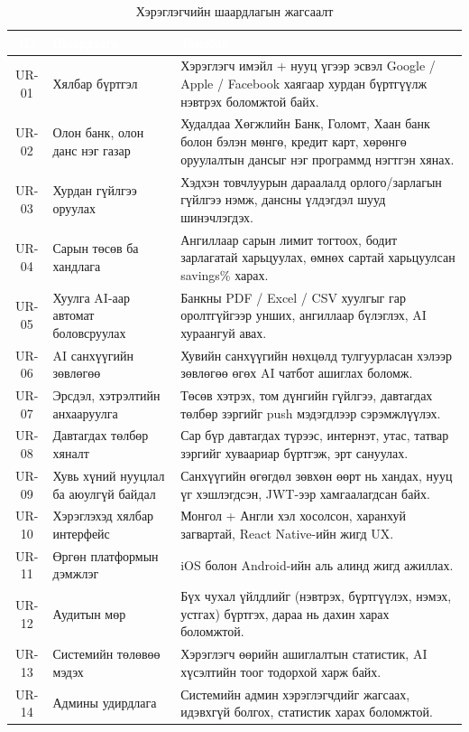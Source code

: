 \begin{table}[ht]
\centering
\footnotesize
\renewcommand{\arraystretch}{1.3}
\begin{tabular}{|c|p{3.7cm}|p{8cm}|}
\hline
\rowcolor{darknavy}
\textcolor{white}{\textbf{ID}} & \textcolor{white}{\textbf{Шаардлага}} & \textcolor{white}{\textbf{Тайлбар}} \\ \hline
UR-01 & Хялбар бүртгэл              & Хэрэглэгч имэйл + нууц үгээр эсвэл Google / Apple / Facebook хаягаар хурдан бүртгүүлж нэвтрэх боломжтой байх. \\ \hline
UR-02 & Олон банк, олон данс нэг газар & Худалдаа Хөгжлийн Банк, Голомт, Хаан банк болон бэлэн мөнгө, кредит карт, хөрөнгө оруулалтын дансыг нэг программд нэгтгэн хянах. \\ \hline
UR-03 & Хурдан гүйлгээ оруулах      & Хэдхэн товчлуурын дараалалд орлого/зарлагын гүйлгээ нэмж, дансны үлдэгдэл шууд шинэчлэгдэх. \\ \hline
UR-04 & Сарын төсөв ба хандлага     & Ангиллаар сарын лимит тогтоох, бодит зарлагатай харьцуулах, өмнөх сартай харьцуулсан savings\% харах. \\ \hline
UR-05 & Хуулга AI-аар автомат боловсруулах & Банкны PDF / Excel / CSV хуулгыг гар оролтгүйгээр унших, ангиллаар бүлэглэх, AI хураангуй авах. \\ \hline
UR-06 & AI санхүүгийн зөвлөгөө      & Хувийн санхүүгийн нөхцөлд тулгуурласан хэлээр зөвлөгөө өгөх AI чатбот ашиглах боломж. \\ \hline
UR-07 & Эрсдэл, хэтрэлтийн анхааруулга & Төсөв хэтрэх, том дүнгийн гүйлгээ, давтагдах төлбөр зэргийг push мэдэгдлээр сэрэмжлүүлэх. \\ \hline
UR-08 & Давтагдах төлбөр хяналт     & Сар бүр давтагдах түрээс, интернэт, утас, татвар зэргийг хуваариар бүртгэж, эрт сануулах. \\ \hline
UR-09 & Хувь хүний нууцлал ба аюулгүй байдал & Санхүүгийн өгөгдөл зөвхөн өөрт нь хандах, нууц үг хэшлэгдсэн, JWT-ээр хамгаалагдсан байх. \\ \hline
UR-10 & Хэрэглэхэд хялбар интерфейс & Монгол + Англи хэл хосолсон, харанхуй загвартай, React Native-ийн жигд UX. \\ \hline
UR-11 & Өргөн платформын дэмжлэг    & iOS болон Android-ийн аль алинд жигд ажиллах. \\ \hline
UR-12 & Аудитын мөр                  & Бүх чухал үйлдлийг (нэвтрэх, бүртгүүлэх, нэмэх, устгах) бүртгэх, дараа нь дахин харах боломжтой. \\ \hline
UR-13 & Системийн төлөвөө мэдэх      & Хэрэглэгч өөрийн ашиглалтын статистик, AI хүсэлтийн тоог тодорхой харж байх. \\ \hline
UR-14 & Админы удирдлага             & Системийн админ хэрэглэгчдийг жагсаах, идэвхгүй болгох, статистик харах боломжтой. \\ \hline
\end{tabular}
\caption{Хэрэглэгчийн шаардлагын жагсаалт}
\label{tab:ur}
\end{table}

